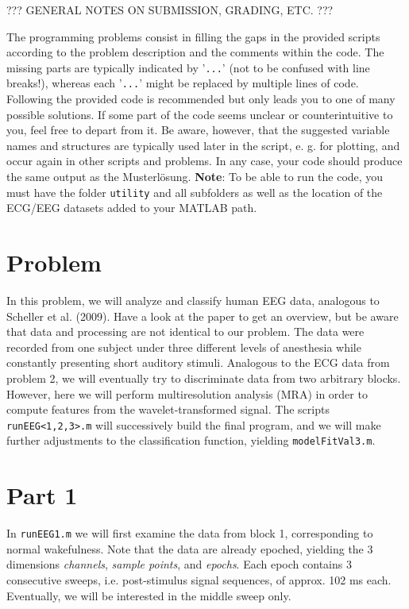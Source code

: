 \documentclass[10pt,a4paper,notitlepage]{report}
\begin{document}
??? GENERAL NOTES ON SUBMISSION, GRADING, ETC. ???

The programming problems consist in filling the gaps in the provided scripts according to the problem description and the comments within the code. The missing parts are typically indicated by '\texttt{...}' (not to be confused with line breaks!), whereas each '\texttt{...}' might be replaced by multiple lines of code. Following the provided code is recommended but only leads you to one of many possible solutions. If some part of the code seems unclear or counterintuitive to you, feel free to depart from it. Be aware, however, that the suggested variable names and structures are typically used later in the script, e. g. for plotting, and occur again in other scripts and problems. In any case, your code should produce the same output as the Musterlösung. \textbf{Note}: To be able to run the code, you must have the folder \texttt{utility} and all subfolders as well as the location of the ECG/EEG datasets added to your MATLAB path.

\section*{Problem}
In this problem, we will analyze and classify human EEG data, analogous to Scheller et al. (2009). Have a look at the paper to get an overview, but be aware that data and processing are not identical to our problem. The data were recorded from one subject under three different levels of anesthesia while constantly presenting short auditory stimuli. Analogous to the ECG data from problem 2, we will eventually try to discriminate data from two arbitrary blocks. However, here we will perform multiresolution analysis (MRA) in order to compute features from the wavelet-transformed signal. The scripts \texttt{runEEG<1,2,3>.m} will successively build the final program, and we will make further adjustments to the classification function, yielding \texttt{modelFitVal3.m}.

\section*{Part 1}
In \texttt{runEEG1.m} we will first examine the data from block 1, corresponding to normal wakefulness. Note that the data are already epoched, yielding the 3 dimensions \textit{channels}, \textit{sample points}, and \textit{epochs}. Each epoch contains 3 consecutive sweeps, i.e. post-stimulus signal sequences, of approx. 102 ms each. Eventually, we will be interested in the middle sweep only.
\end{document}

